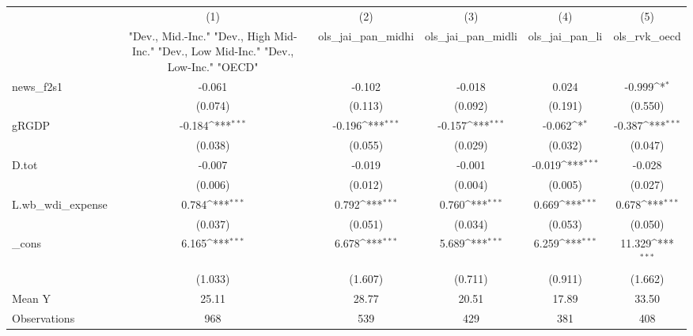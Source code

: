 {
\def\sym#1{\ifmmode^{#1}\else\(^{#1}\)\fi}
\begin{tabular}{l*{5}{c}}
\toprule
            &\multicolumn{1}{c}{(1)}&\multicolumn{1}{c}{(2)}&\multicolumn{1}{c}{(3)}&\multicolumn{1}{c}{(4)}&\multicolumn{1}{c}{(5)}\\
            &\multicolumn{1}{c}{ "Dev., Mid.-Inc." "Dev., High Mid-Inc." "Dev., Low Mid-Inc." "Dev., Low-Inc." "OECD" }&\multicolumn{1}{c}{ols\_jai\_pan\_midhi}&\multicolumn{1}{c}{ols\_jai\_pan\_midli}&\multicolumn{1}{c}{ols\_jai\_pan\_li}&\multicolumn{1}{c}{ols\_rvk\_oecd}\\
\midrule
news\_f2s1   &      -0.061         &      -0.102         &      -0.018         &       0.024         &      -0.999\sym{*}  \\
            &     (0.074)         &     (0.113)         &     (0.092)         &     (0.191)         &     (0.550)         \\
\addlinespace
gRGDP       &      -0.184\sym{***}&      -0.196\sym{***}&      -0.157\sym{***}&      -0.062\sym{*}  &      -0.387\sym{***}\\
            &     (0.038)         &     (0.055)         &     (0.029)         &     (0.032)         &     (0.047)         \\
\addlinespace
D.tot       &      -0.007         &      -0.019         &      -0.001         &      -0.019\sym{***}&      -0.028         \\
            &     (0.006)         &     (0.012)         &     (0.004)         &     (0.005)         &     (0.027)         \\
\addlinespace
L.wb\_wdi\_expense&       0.784\sym{***}&       0.792\sym{***}&       0.760\sym{***}&       0.669\sym{***}&       0.678\sym{***}\\
            &     (0.037)         &     (0.051)         &     (0.034)         &     (0.053)         &     (0.050)         \\
\addlinespace
\_cons      &       6.165\sym{***}&       6.678\sym{***}&       5.689\sym{***}&       6.259\sym{***}&      11.329\sym{***}\\
            &     (1.033)         &     (1.607)         &     (0.711)         &     (0.911)         &     (1.662)         \\
\midrule
Mean Y      &       25.11         &       28.77         &       20.51         &       17.89         &       33.50         \\
Observations&         968         &         539         &         429         &         381         &         408         \\
\bottomrule
\end{tabular}
}
